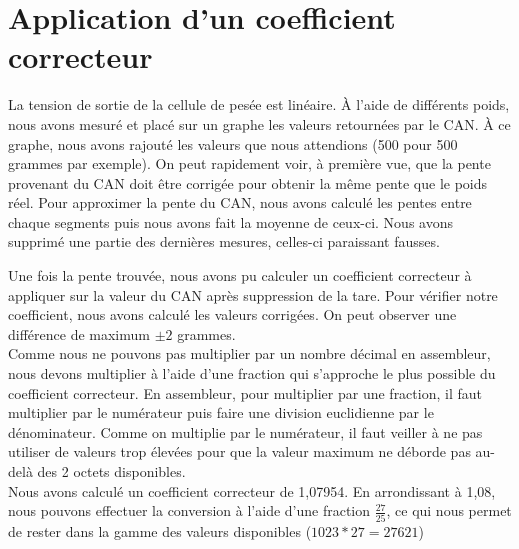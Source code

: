 \documentclass[a4paper,11pt,titlepage]{article}
\begin{document}
\section{Application d'un coefficient correcteur}

La tension de sortie de la cellule de pesée est linéaire. À l'aide de différents poids, nous avons mesuré et placé sur un graphe les valeurs retournées par le CAN. À ce graphe, nous avons rajouté les valeurs que nous attendions (500 pour 500 grammes par exemple). On peut rapidement voir, à première vue, que la pente provenant du CAN doit être corrigée pour obtenir la même pente que le poids réel. Pour approximer la pente du CAN, nous avons calculé les pentes entre chaque segments puis nous avons fait la moyenne de ceux-ci. Nous avons supprimé une partie des dernières mesures, celles-ci paraissant fausses.\\


Une fois la pente trouvée, nous avons pu calculer un coefficient correcteur à appliquer sur la valeur du CAN après suppression de la tare. Pour vérifier notre coefficient, nous avons calculé les valeurs corrigées. On peut observer une différence de maximum $\pm{2}$ grammes.\\

Comme nous ne pouvons pas multiplier par un nombre décimal en assembleur, nous devons multiplier à l'aide d'une fraction qui s'approche le plus possible du coefficient correcteur. En assembleur, pour multiplier par une fraction, il faut multiplier par le numérateur puis faire une division euclidienne par le dénominateur. Comme on multiplie par le numérateur, il faut veiller à ne pas utiliser de valeurs trop élevées pour que la valeur maximum ne déborde pas au-delà des 2 octets disponibles.\\

Nous avons calculé un coefficient correcteur de 1,07954. En arrondissant à 1,08, nous pouvons effectuer la conversion à l'aide d'une fraction $\frac{27}{25}$, ce qui nous permet de rester dans la gamme des valeurs disponibles ($1023 * 27 = 27621$)\\
\end{document}
